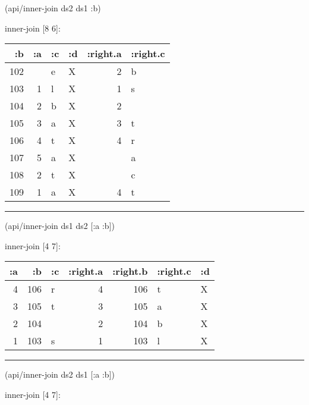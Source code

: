 \documentclass[]{article}
\newenvironment{Shaded}{\begin{snugshade}}{\end{snugshade}}
\newcommand{\AttributeTok}[1]{\textcolor[rgb]{0.77,0.63,0.00}{#1}}
\newcommand{\NormalTok}[1]{#1}
\begin{document}
\begin{Shaded}
\begin{Highlighting}[]
\NormalTok{(api/inner-join ds2 ds1 }\AttributeTok{:b}\NormalTok{)}
\end{Highlighting}
\end{Shaded}

inner-join {[}8 6{]}:

\begin{longtable}[]{@{}rrllrl@{}}
\toprule
:b & :a & :c & :d & :right.a & :right.c\tabularnewline
\midrule
\endhead
102 & & e & X & 2 & b\tabularnewline
103 & 1 & l & X & 1 & s\tabularnewline
104 & 2 & b & X & 2 &\tabularnewline
105 & 3 & a & X & 3 & t\tabularnewline
106 & 4 & t & X & 4 & r\tabularnewline
107 & 5 & a & X & & a\tabularnewline
108 & 2 & t & X & & c\tabularnewline
109 & 1 & a & X & 4 & t\tabularnewline
\bottomrule
\end{longtable}

\begin{center}\rule{0.5\linewidth}{0.5pt}\end{center}

\begin{Shaded}
\begin{Highlighting}[]
\NormalTok{(api/inner-join ds1 ds2 [}\AttributeTok{:a} \AttributeTok{:b}\NormalTok{])}
\end{Highlighting}
\end{Shaded}

inner-join {[}4 7{]}:

\begin{longtable}[]{@{}rrlrrll@{}}
\toprule
:a & :b & :c & :right.a & :right.b & :right.c & :d\tabularnewline
\midrule
\endhead
4 & 106 & r & 4 & 106 & t & X\tabularnewline
3 & 105 & t & 3 & 105 & a & X\tabularnewline
2 & 104 & & 2 & 104 & b & X\tabularnewline
1 & 103 & s & 1 & 103 & l & X\tabularnewline
\bottomrule
\end{longtable}

\begin{center}\rule{0.5\linewidth}{0.5pt}\end{center}

\begin{Shaded}
\begin{Highlighting}[]
\NormalTok{(api/inner-join ds2 ds1 [}\AttributeTok{:a} \AttributeTok{:b}\NormalTok{])}
\end{Highlighting}
\end{Shaded}

inner-join {[}4 7{]}:
\end{document}
